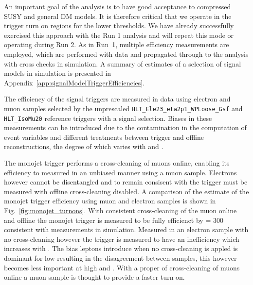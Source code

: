 An important goal of the analysis is to have good acceptance
to compressed SUSY and general DM models. It is therefore critical
that we operate in the trigger turn on regions for the lower
thresholds. We have already successfully exercised this approach with 
the Run 1 analysis and will repeat this mode or operating during Run 2.
As in Run~1, multiple efficiency measurements are
employed, which are performed with data and propagated through to the
analysis with cross checks in simulation. A summary of estimates of a 
selection of signal models in simulation is presented in Appendix~\ref{app:signalModelTriggerEfficiencies}.



% 

The efficiency of the signal triggers are measured in data using electron and muon samples 
selected by the unprescaled \verb!HLT_Ele23_eta2p1_WPLoose_Gsf! and \verb!HLT_IsoMu20! 
reference triggers with a signal selection. Biases in these measurements can be introduced 
due to the contamination in the computation of event variables and different treatments 
between trigger and offline reconstructions, the degree of which varies with \scalht and \njet.

The monojet trigger performs a cross-cleaning of muons online, enabling its efficiency to measured
in an unbiased manner using a muon sample. Electrons however cannot be disentangled and to remain 
consisent with the trigger must be measured with offline cross-cleaning disabled. A comparison of 
the estimate of the monojet trigger efficiency using muon and electron samples is shown in Fig.~\ref{fig:monojet_turnons}.
With consistent cross-cleaning of the muon online and offline the monojet trigger is measured to be fully efficienct
by \scalht = 300 consistent with measurements in simulation. Measured in an electron sample with no cross-cleaning however
the trigger is measured to have an inefficiency which increases with \scalht. The bias leptons introduce when no cross-cleaning
is appled is dominant for low-\scalht resulting in the disagreement between samples, this however becomes less important at high
\scalht and \njet. With a proper of cross-cleaning of muons online a muon sample is thought to provide a faster
turn-on.



